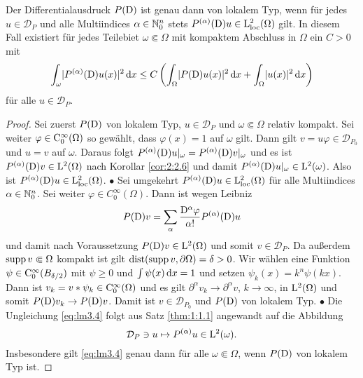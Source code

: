 \begin{lem}\label{lem : loktyp}
Der Differentialausdruck $P(\mathrm D)$ ist genau dann von lokalem Typ, wenn für jedes $u\in\mathcal D_P$ und alle Multiindices $\alpha\in\mathbb N_0^n$ stets $P^{(\alpha)}(\mathrm D)u \in \mathrm L^2_{\rm loc}(\Omega)$ gilt. In diesem Fall existiert für jedes Teilebiet $\omega\Subset \Omega$ mit kompaktem Abschluss in $\Omega$ ein $C>0$ mit
\begin{equation}
\int_{\omega} \lvert P^{(\alpha)}(\mathrm D)u(x)\rvert^2\,\mathrm d x\leq C\left( \int_{\Omega} \lvert P(\mathrm D)u(x)\rvert^2\,\mathrm d x + \int_{\Omega} \lvert u(x)\rvert^2 \,\mathrm d x \right) \label{eq:lm3.4}
\end{equation}
für alle $u\in\mathcal{D}_P$.
\end{lem}
\begin{proof}
Sei zuerst $P(\mathrm D)$ von lokalem Typ, $u\in\mathcal{D}_P$ und $\omega\Subset\Omega$ relativ kompakt. Sei weiter $\varphi\in\mathrm C_0^\infty(\Omega)$ so gewählt, dass $\varphi(x)=1$ auf $\omega$ gilt. Dann gilt $v=u\varphi\in\mathcal D_{P_0}$ und $u=v$ auf $\omega$. Daraus folgt $P^{(\alpha)}(\mathrm D)u|_\omega=P^{(\alpha)}(\mathrm D)v|_\omega$ und es ist $P^{(\alpha)}(\mathrm D)v\in\mathrm L^2(\Omega)$ nach Korollar \ref{cor:2:2.6} und damit $P^{(\alpha)}(\mathrm D)u|_\omega \in\mathrm L^2(\omega)$. 
Also ist $P^{(\alpha)}(\mathrm D)u \in \mathrm L^2_{\rm loc}(\Omega)$. $\bullet$\qquad
Sei umgekehrt $P^{(\alpha)}(\mathrm D)u \in \mathrm L^2_{\rm loc}(\Omega)$ für alle Multiindices $\alpha\in\mathbb N_0^n$. Sei weiter $\varphi\in C_0^\infty(\Omega)$. Dann ist wegen Leibniz
\begin{equation}
P(\mathrm D)v=\sum_\alpha \dfrac{\mathrm D^\alpha \varphi}{{\alpha}!}P^{(\alpha)}(\mathrm D)u
\end{equation}
und damit nach Voraussetzung $P(\mathrm D)v\in \mathrm L^2(\Omega)$ und somit $v\in\mathcal{D}_P$. Da außerdem $\operatorname{supp} v\Subset\Omega$ kompakt ist gilt $\operatorname{dist}(\operatorname{supp} v,\partial\Omega)=\delta>0$. Wir wählen eine Funktion $\psi\in\mathrm C_0^\infty(B_{\delta/2})$ mit $\psi\ge0$ und $\int\psi(x)\,\mathrm d x=1$ und setzen $\psi_k(x)=k^{n} \psi(k x)$. Dann ist
$v_k=v*\psi_k\in\mathrm C_0^\infty(\Omega)$ und es gilt $\partial^\alpha v_k\to \partial^\alpha v$, $k\to\infty$, in $\mathrm L^2(\Omega)$ 
und somit $P(\mathrm D)v_k\to P(\mathrm D)v$. Damit ist $v\in \mathcal{D}_{P_0}$ und $P(\mathrm D)$ von lokalem Typ. $\bullet$ \qquad 
Die Ungleichung \eqref{eq:lm3.4} folgt aus Satz \ref{thm:1:1.1} angewandt auf die Abbildung
\begin{equation}
\mathcal{D}_P \ni u \mapsto P^{(\alpha)}u\in \mathrm L^2(\omega).
\end{equation}
Insbesondere gilt \eqref{eq:lm3.4} genau dann für alle $\omega\Subset\Omega$, wenn $P(\mathrm D)$ von lokalem Typ ist.
\end{proof}

